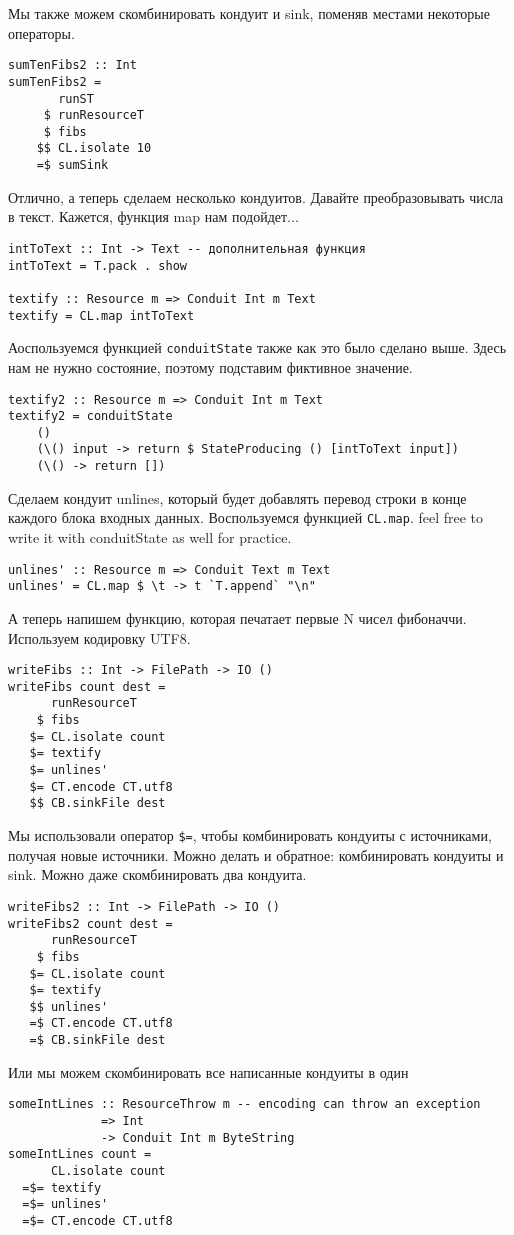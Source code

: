Мы также можем скомбинировать кондуит и sink, поменяв местами некоторые операторы.
\begin{lstlisting}sumTenFibs2 :: Int
sumTenFibs2 =
       runST
     $ runResourceT
     $ fibs
    $$ CL.isolate 10
    =$ sumSink
\end{lstlisting}
Отлично, а теперь сделаем несколько кондуитов. Давайте преобразовывать числа в текст.
Кажется, функция map нам подойдет...
\begin{lstlisting}
intToText :: Int -> Text -- дополнительная функция 
intToText = T.pack . show

textify :: Resource m => Conduit Int m Text
textify = CL.map intToText
\end{lstlisting}
Аоспользуемся функцией \lstinline=conduitState= также как это было сделано выше. Здесь
нам не нужно
состояние, поэтому подставим фиктивное значение.
\begin{lstlisting}textify2 :: Resource m => Conduit Int m Text
textify2 = conduitState
    ()
    (\() input -> return $ StateProducing () [intToText input])
    (\() -> return [])
\end{lstlisting}
Сделаем кондуит unlines, который будет добавлять перевод строки в конце каждого блока
входных данных. Воспользуемся функцией \lstinline=CL.map=. feel free to write it with
conduitState as
well for practice.
\begin{lstlisting}unlines' :: Resource m => Conduit Text m Text
unlines' = CL.map $ \t -> t `T.append` "\n"
\end{lstlisting}
А теперь напишем функцию, которая печатает первые N чисел фибоначчи. Используем
кодировку UTF8.
\begin{lstlisting}writeFibs :: Int -> FilePath -> IO ()
writeFibs count dest =
      runResourceT
    $ fibs
   $= CL.isolate count
   $= textify
   $= unlines'
   $= CT.encode CT.utf8
   $$ CB.sinkFile dest
\end{lstlisting}
Мы использовали оператор \lstinline'$=', чтобы комбинировать кондуиты с источниками,
получая
новые источники. Можно делать и обратное: комбинировать кондуиты и sink. Можно даже
скомбинировать два кондуита.
\begin{lstlisting}
writeFibs2 :: Int -> FilePath -> IO ()
writeFibs2 count dest =
      runResourceT
    $ fibs
   $= CL.isolate count
   $= textify
   $$ unlines'
   =$ CT.encode CT.utf8
   =$ CB.sinkFile dest
\end{lstlisting}
Или мы можем скомбинировать все написанные кондуиты в один
\begin{lstlisting}
someIntLines :: ResourceThrow m -- encoding can throw an exception
             => Int
             -> Conduit Int m ByteString
someIntLines count =
      CL.isolate count
  =$= textify
  =$= unlines'
  =$= CT.encode CT.utf8
\end{lstlisting}
